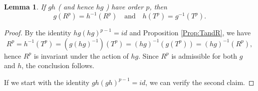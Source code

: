 \documentclass[12pt,reqno]{amsart}
\theoremstyle{plain}
\newtheorem{lemma}[theorem]{Lemma}
\theoremstyle{definition}
\theoremstyle{remark}
\numberwithin{equation}{section}
\begin{document}
\begin{lemma}\label{Lem:Flip}
	If  $gh$  \emph{(} and hence  $hg$ \emph{)}  have order  $p$, 
	then 
	\begin{equation*} 
		g(R^p) = h^{-1}(R^p) 
		\quad \text{and} \quad 
		h(T^p) = g^{-1}(T^p).   
	\end{equation*} 	
\end{lemma} 
\begin{proof}  
	By the identity  $hg(hg)^{p-1} = id$  and Proposition \ref{Prop:TandR}, 
	we have 
	\begin{equation*} 
		R^p = h^{-1}(T^p) 
		= (g(hg)^{-1})(T^p) 
		= (hg)^{-1}(g(T^p)) 
		= (hg)^{-1}(R^p), 
	\end{equation*} 
	hence  $R^p$  is invariant under the action of  $hg$.  
	Since  $R^p$  is admissible for both  $g$  and  $h$, 
	the conclusion follows. 
	
	If we start with the identity  $gh(gh)^{p-1} = id$, 
	we can verify the second claim.  
\end{proof} 
\end{document}
